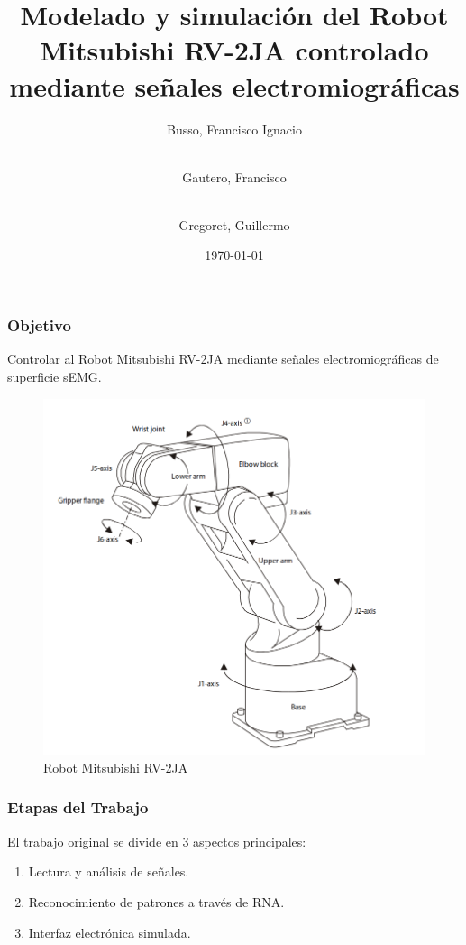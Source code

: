 \documentclass{beamer}
\title{Modelado y simulación del Robot Mitsubishi RV-2JA controlado
mediante señales electromiográficas}
\author{
    Busso, Francisco Ignacio \and
    \\ Gautero, Francisco \and
    \\ Gregoret, Guillermo}
\institute{Universidad Tecnológica Nacional\\Facultad Regional Santa Fe}
\date{\today}
\begin{document}
    \begin{frame}
        \titlepage
    \end{frame}

    \begin{frame}
        \frametitle{Objetivo}
        \hspace*{20pt}Controlar al Robot Mitsubishi RV-2JA mediante señales electromiográficas de superficie sEMG.
        \begin{figure}
            \centering
            \includegraphics[scale=0.2]{robot.png}
            \caption{Robot Mitsubishi RV-2JA}
        \end{figure}
    \end{frame} 

    \begin{frame}
        \frametitle{Etapas del Trabajo}
        El trabajo original se divide en 3 aspectos principales:
            \begin{enumerate}
             \item Lectura y análisis de señales.
             \item Reconocimiento de patrones a través de RNA.
             \item Interfaz electrónica simulada.
            \end{enumerate}
    \end{frame} 
\end{document}

